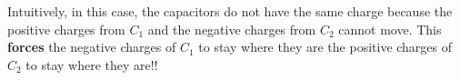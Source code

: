 \begin{enumerate}
{Intuitively, in this case, the capacitors do not have the same charge because the positive charges from $C_1$ and the negative charges from $C_2$ cannot move. This \textbf{forces} the negative charges of $C_1$ to stay where they are the positive charges of $C_2$ to stay where they are!! 
}



\end{enumerate}